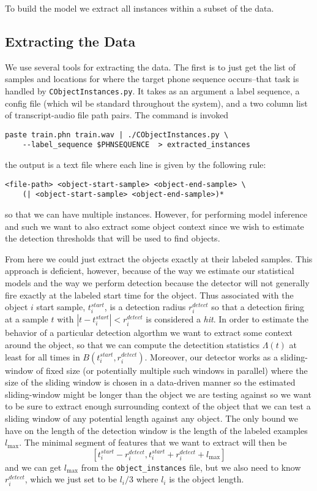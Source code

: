\documentclass{article}
\begin{document}
To build the model we extract all instances within a subset of the data.

\subsection{Extracting the Data}

We use several tools for extracting the data. The first is to just get the list of samples and locations for where the 
target phone sequence occurs--that task is handled by \texttt{CObjectInstances.py}. It takes as an argument a label sequence, a config file
(which wil be standard throughout the system), and a two column list of transcript-audio file path pairs. The command is invoked
\begin{verbatim}
paste train.phn train.wav | ./CObjectInstances.py \
    --label_sequence $PHNSEQUENCE  > extracted_instances
\end{verbatim}
the output is a text file where each line is given by the following rule:
\begin{verbatim}
<file-path> <object-start-sample> <object-end-sample> \
    (| <object-start-sample> <object-end-sample>)*
\end{verbatim}
so that we can have multiple instances.  However, for performing model inference and such we want to also extract some object context
since we wish to estimate the detection thresholds that will be used to find objects.

From here we could just extract the objects exactly at
their labeled samples.  This approach is deficient, however,
because of the way we estimate our statistical models and the
way we perform detection because the detector will not generally
fire exactly at the labeled start time for the object.  Thus
associated with the object $i$ start sample, $t_i^{start}$, is a detection
radius $r_i^{detect}$ so that a detection firing at a sample
$t$ with $|t-t_i^{start}|<r_i^{detect}$ is considered a \textit{hit}.
In order to estimate the behavior of a particular detection
algorthm
we want to extract some context around the object, so that
we can compute the detectition statistics $\Lambda(t)$ at least
for all times in $B(t_i^{start},r_i^{detect})$.  Moreover,
our detector works as a sliding-window of fixed size
(or potentially multiple such windows in parallel) where the size
of the sliding window is chosen in a data-driven manner so the
estimated sliding-window might be longer than the object we are
testing against so we want to be sure to extract enough surrounding
context of the object that we can test a sliding window of any
potential length against any object.  The only bound we have
on the length of the detection window is the length of the
labeled examples $l_{\max}$.  The minimal segment of features
that we want to extract will then be
$$[t_i^{start}-r_i^{detect},t_i^{start}+r_i^{detect}+l_{\max}]$$
and we can get $l_{\max}$ from the \texttt{object\_instances} file,
but we also need to know $r_i^{detect}$, which we just set to be
$l_i/3$ where $l_i$ is the object length.
\end{document}
